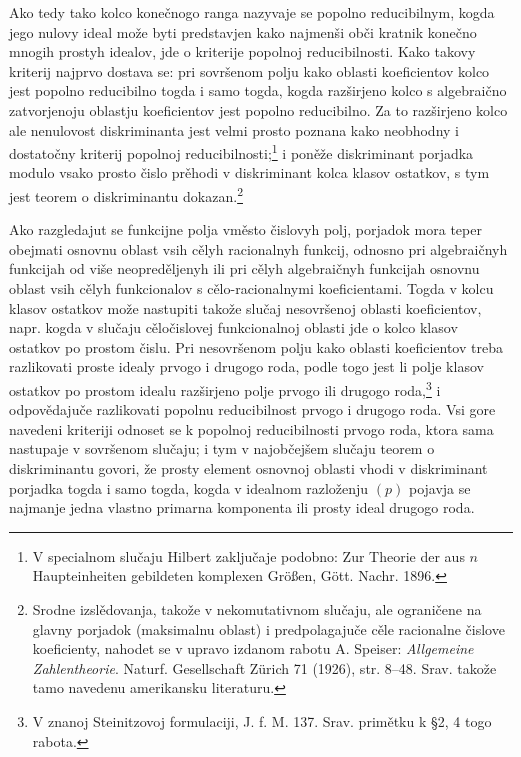 \documentclass[11pt]{article}
\begin{document}
Ako tedy tako kolco konečnogo ranga nazyvaje se popolno reducibilnym, kogda jego nulovy ideal može byti predstavjen kako najmenši obči kratnik konečno mnogih prostyh idealov, jde o kriterije popolnoj reducibilnosti. Kako takovy kriterij najprvo dostava se: pri sovršenom polju kako oblasti koeficientov kolco jest popolno reducibilno togda i samo togda, kogda razširjeno kolco s algebraično zatvorjenoju oblastju koeficientov jest popolno reducibilno. Za to razširjeno kolco ale nenulovost diskriminanta jest velmi prosto poznana kako neobhodny i dostatočny kriterij popolnoj reducibilnosti;\footnote{V specialnom slučaju Hilbert zaključaje podobno: Zur Theorie der aus $n$ Haupteinheiten gebildeten komplexen Größen, Gött. Nachr. 1896.} i poněže diskriminant porjadka modulo vsako prosto čislo prěhodi v diskriminant kolca klasov ostatkov, s tym jest teorem o diskriminantu dokazan.\footnote{Srodne izslědovanja, takože v nekomutativnom slučaju, ale ograničene na glavny porjadok (maksimalnu oblast) i predpolagajuče cěle racionalne čislove koeficienty, nahodet se v upravo izdanom rabotu A. Speiser: \emph{Allgemeine Zahlentheorie}. Naturf. Gesellschaft Zürich 71 (1926), str. 8--48. Srav. takože tamo navedenu amerikansku literaturu.}

Ako razgledajut se funkcijne polja vměsto čislovyh polj, porjadok mora teper obejmati osnovnu oblast vsih cělyh racionalnyh funkcij, odnosno pri algebraičnyh funkcijah od više neopreděljenyh ili pri cělyh algebraičnyh funkcijah osnovnu oblast vsih cělyh funkcionalov s cělo-racionalnymi koeficientami. Togda v kolcu klasov ostatkov može nastupiti takože slučaj nesovršenoj oblasti koeficientov, napr. kogda v slučaju cěločislovej funkcionalnoj oblasti jde o kolco klasov ostatkov po prostom čislu. Pri nesovršenom polju kako oblasti koeficientov treba razlikovati proste idealy prvogo i drugogo roda, podle togo jest li polje klasov ostatkov po prostom idealu razširjeno polje prvogo ili drugogo roda,\footnote{V znanoj Steinitzovoj formulaciji, J. f. M. 137. Srav. primětku k \S 2, 4 togo rabota.} i odpovědajuče razlikovati popolnu reducibilnost prvogo i drugogo roda. Vsi gore navedeni kriteriji odnoset se k popolnoj reducibilnosti prvogo roda, ktora sama nastupaje v sovršenom slučaju; i tym v najobčejšem slučaju teorem o diskriminantu govori, že prosty element osnovnoj oblasti vhodi v diskriminant porjadka togda i samo togda, kogda v idealnom razloženju $(p)$ pojavja se najmanje jedna vlastno primarna komponenta ili prosty ideal drugogo roda.
\end{document}
